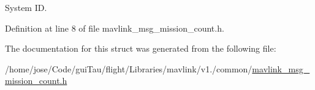 System I\-D. 



Definition at line 8 of file mavlink\-\_\-msg\-\_\-mission\-\_\-count.\-h.



The documentation for this struct was generated from the following file\-:\begin{DoxyCompactItemize}
\item 
/home/jose/\-Code/gui\-Tau/flight/\-Libraries/mavlink/v1./common/\hyperlink{mavlink__msg__mission__count_8h}{mavlink\-\_\-msg\-\_\-mission\-\_\-count.\-h}\end{DoxyCompactItemize}
